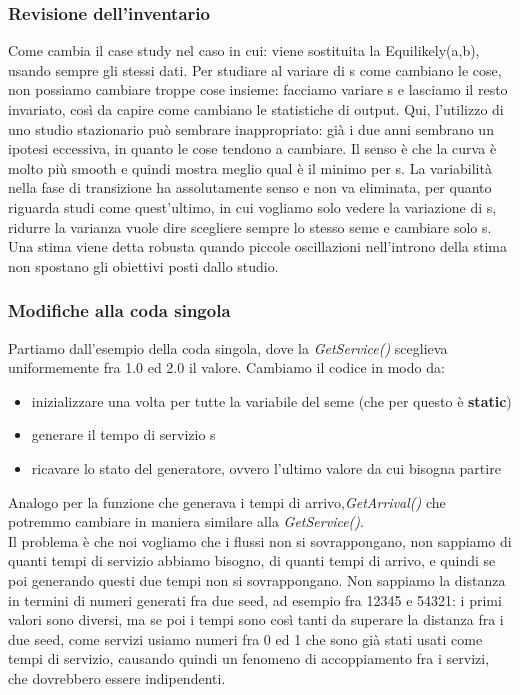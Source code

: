 \documentclass{article}
\begin{document}
\subsubsection{Revisione dell'inventario}
Come cambia il case study nel caso in cui: viene sostituita la Equilikely(a,b), usando sempre gli stessi dati. Per studiare al variare di s come cambiano le cose, non possiamo cambiare troppe cose insieme: facciamo variare s e lasciamo il resto invariato, così da capire come cambiano le statistiche di output. Qui, l'utilizzo di uno studio stazionario può sembrare inappropriato: già i due anni sembrano un ipotesi eccessiva, in quanto le cose tendono a cambiare. Il senso è che la curva è molto più smooth e quindi mostra meglio qual è il minimo per s. La variabilità nella fase di transizione ha assolutamente senso e non va eliminata, per quanto riguarda studi come quest'ultimo, in cui vogliamo solo vedere la variazione di s, ridurre la varianza vuole dire scegliere sempre lo stesso seme e cambiare solo s. Una stima viene detta robusta quando piccole oscillazioni nell'introno della stima non spostano gli obiettivi posti dallo studio.
\subsubsection{Modifiche alla coda singola}
Partiamo dall'esempio della coda singola, dove la \textit{GetService()} sceglieva uniformemente fra 1.0 ed 2.0 il valore. Cambiamo il codice in modo da:
\begin{itemize}
\item inizializzare una volta per tutte la variabile del seme (che per questo è \textbf{static})
\item generare il tempo di servizio s
\item ricavare lo stato del generatore, ovvero l'ultimo valore da cui bisogna partire
\end{itemize}
Analogo per la funzione che generava i tempi di arrivo,\textit{GetArrival()} che potremmo cambiare in maniera similare alla \textit{GetService()}.\\ Il problema è che noi vogliamo che i flussi non si sovrappongano, non sappiamo di quanti tempi di servizio abbiamo bisogno, di quanti tempi di arrivo, e quindi se poi generando questi due tempi non si sovrappongano. Non sappiamo la distanza in termini di numeri generati fra due seed, ad esempio fra 12345 e 54321: i primi valori sono diversi, ma se poi i tempi sono così tanti da superare la distanza fra i due seed, come servizi usiamo numeri fra 0 ed 1 che sono già stati usati come tempi di servizio, causando quindi un fenomeno di accoppiamento fra i servizi, che dovrebbero essere indipendenti.
\end{document}
